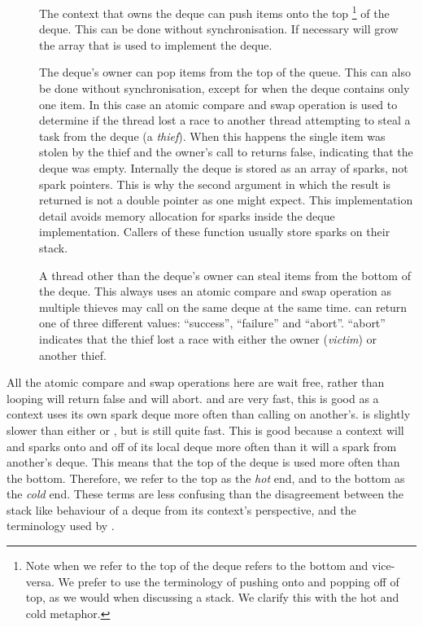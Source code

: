 \begin{description}

    \item[]
    The context that owns the deque can push items onto the top%
\footnote{
        Note when we refer to the top of the deque
        \citet{Chase_2005_wsdeque} refers to the bottom and vice-versa.
        We prefer to use the terminology of pushing onto and popping off of
        top, as we would when discussing a stack.
        We clarify this with the hot and cold metaphor.}
    of the deque.
    This can be done without synchronisation.
    If necessary
    \push will grow the array that is used to implement the
    deque.

    \item[]
    The deque's owner can pop items from the top of the queue.
    This can also be done without synchronisation,
    except for when the deque contains only one item.
    In this case an atomic compare and swap operation is used to
    determine if the thread lost a race to another thread attempting to
    steal a task from the deque (a \emph{thief}).
    When this happens the single item was stolen by the thief and the
    owner's call to \pop returns false,
    indicating that the deque was empty.
    Internally the deque is stored as an array of sparks, not spark
    pointers.
    This is why the second argument in which the result is returned is not a
    double pointer as one might expect.
    This implementation detail avoids memory allocation for sparks inside
    the deque implementation.
    Callers of these function usually store sparks on their stack.

    \item[]
    A thread other than the deque's owner can steal
    items from the bottom of the deque.
    This always uses an atomic compare and swap operation as multiple
    thieves may call \steal on the same deque at the same time.
    \steal can return one of three different values:
    ``success'', ``failure'' and ``abort''.
    ``abort'' indicates that the thief lost a race with either the owner
    (\emph{victim}) or another thief.

\end{description}

All the atomic compare and swap operations here are wait free,
rather than looping \pop will return false and \steal will abort.
\push and \pop are very fast, this is good as a context uses its own
spark deque more often than calling \steal on another's.
\steal is slightly slower than either \push or \pop,
but is still quite fast.
This is good because a context will 
\push and \pop sparks onto and off of its local deque
more often than it will \steal a spark from another's deque.
This means that the top of the deque is used more often than the bottom.
Therefore, we refer to the top as the \emph{hot} end,
and to the bottom as the \emph{cold} end.
These terms are less confusing than the disagreement between the stack
like behaviour of a deque from its context's perspective,
and the terminology used by \citet{Chase_2005_wsdeque}. 

